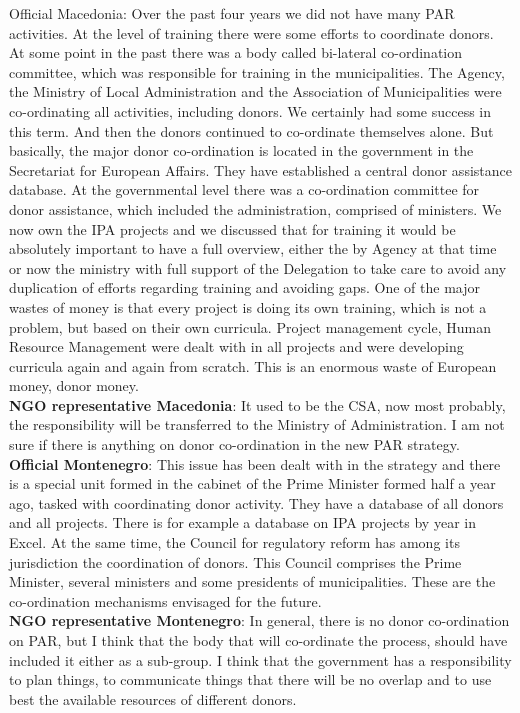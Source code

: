 Official Macedonia: Over the past four years we did not have many PAR activities. At the level of training there were some efforts to coordinate donors. At some point in the past there was a body called bi-lateral co-ordination committee, which was responsible for training in the municipalities. The Agency, the Ministry of Local Administration and the Association of Municipalities were co-ordinating all activities, including donors. We certainly had some success in this term. And then the donors continued to co-ordinate themselves alone. But basically, the major donor co-ordination is located in the government in the Secretariat for European Affairs. They have established a central donor assistance database. At the governmental level there was a co-ordination committee for donor assistance, which included the administration, comprised of ministers. We now own the IPA projects and we discussed that for training it would be absolutely important to have a full overview,  either the by Agency at that time or now the ministry with full support of the Delegation to take care to avoid any duplication of efforts regarding training and avoiding gaps. One of the major wastes of money is that every project is doing its own training, which is not a problem, but based on their own curricula. Project management cycle, Human Resource Management were dealt with in all projects and were developing curricula again and again from scratch. This is an enormous waste of European money, donor money. \\
\textbf{NGO representative Macedonia}: It used to be the CSA, now most probably, the responsibility will be transferred to the Ministry of Administration. I am not sure if there is anything on donor co-ordination in the new PAR strategy. \\
\textbf{Official Montenegro}: This issue has been dealt with in the strategy and there is a special unit formed in the cabinet of the Prime Minister formed half a year ago, tasked with coordinating donor activity. They have a database of all donors and all projects. There is for example a database on IPA projects by year in Excel. At the same time, the Council for regulatory reform has among its jurisdiction the coordination of donors. This Council comprises the Prime Minister, several ministers and some presidents of municipalities. These are the co-ordination mechanisms envisaged for the future.  \\
\textbf{NGO representative Montenegro}: In general, there is no donor co-ordination on PAR, but I think that the body that will co-ordinate the process, should have included it either as a sub-group. I think that the government has a responsibility to plan things, to communicate things that there will be no overlap and to use best the available resources of different donors.%
